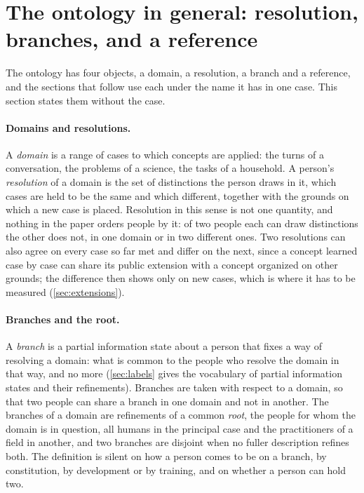 \section{The ontology in general: resolution, branches, and a reference}
\label{sec:general}

The ontology has four objects, a domain, a resolution, a branch and a reference, and the sections that follow use each under the name it has in one case. This section states them without the case.

\paragraph{Domains and resolutions.} A \emph{domain} is a range of cases to which concepts are applied: the turns of a conversation, the problems of a science, the tasks of a household. A person's \emph{resolution} of a domain is the set of distinctions the person draws in it, which cases are held to be the same and which different, together with the grounds on which a new case is placed. Resolution in this sense is not one quantity, and nothing in the paper orders people by it: of two people each can draw distinctions the other does not, in one domain or in two different ones. Two resolutions can also agree on every case so far met and differ on the next, since a concept learned case by case can share its public extension with a concept organized on other grounds; the difference then shows only on new cases, which is where it has to be measured (\autoref{sec:extensions}).

\paragraph{Branches and the root.} A \emph{branch} is a partial information state about a person that fixes a way of resolving a domain: what is common to the people who resolve the domain in that way, and no more (\autoref{sec:labels} gives the vocabulary of partial information states and their refinements). Branches are taken with respect to a domain, so that two people can share a branch in one domain and not in another. The branches of a domain are refinements of a common \emph{root}, the people for whom the domain is in question, all humans in the principal case and the practitioners of a field in another, and two branches are disjoint when no fuller description refines both. The definition is silent on how a person comes to be on a branch, by constitution, by development or by training, and on whether a person can hold two.

